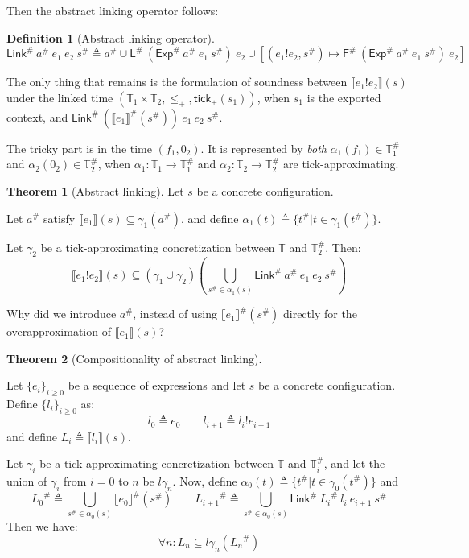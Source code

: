 \documentclass[acmsmall,review]{acmart}\settopmatter{printfolios=true,printccs=false,printacmref=false}
\theoremstyle{definition}
\newtheorem{definition}{Definition}[section]
\newtheorem{thm}{Theorem}[section]
\newcommand*{\A}[1]{{#1}^{\#}}
\newcommand*{\Time}{\mathbb{T}}
\newcommand*{\ATime}{\A{\Time}}
\newcommand*{\link}[2]{{#1}\mathtt{!}{#2}}
\newcommand*{\EE}{\mathsf{Exp}}
\newcommand*{\LL}{\mathsf{L}}
\newcommand*{\Link}{\mathsf{Link}}
\newcommand*{\sembracket}[1]{\lBrack{#1}\rBrack}
\newcommand*{\tick}{\mathsf{tick}}
\begin{document}
Then the abstract linking operator follows:
\begin{definition}[Abstract linking operator]
  \[
    \A\Link\:\A{a}\:e_1\:e_2\:\A{s}\triangleq\A{a}\cup\A\LL\:(\A\EE\:\A{a}\:e_1\:\A{s})\:e_2\cup[(\link{e_1}{e_2},\A{s})\mapsto\A{\mathsf{F}}\:(\A\EE\:\A{a}\:e_1\:\A{s})\:e_2]
  \]
\end{definition}

The only thing that remains is the formulation of soundness between $\sembracket{\link{e_1}{e_2}}(s)$ under the linked time $(\Time_1\times\Time_2,\le_+,\tick_{+}(s_1))$, when $s_1$ is the exported context,
and $\A\Link\:(\A{\sembracket{e_1}}(\A{s}))\:e_1\:e_2\:\A{s}$.

The tricky part is in the time $(f_1,0_2)$.
It is represented by \emph{both} $\alpha_1(f_1)\in\ATime_1$ and $\alpha_2(0_2)\in\ATime_2$, when $\alpha_1:\Time_1\rightarrow\ATime_1$ and $\alpha_2:\Time_2\rightarrow\ATime_2$ are tick-approximating.

\begin{thm}[Abstract linking]
  Let $s$ be a concrete configuration.

  Let $\A{a}$ satisfy $\sembracket{e_1}(s)\subseteq\gamma_1(\A{a})$, and define $\alpha_1(t)\triangleq\{\A{t}|t\in\gamma_1(\A{t})\}$.

  Let $\gamma_2$ be a tick-approximating concretization between $\Time$ and $\ATime_2$. Then:
  \[
    \sembracket{\link{e_1}{e_2}}(s)\subseteq(\gamma_1\cup\gamma_2)\left(\bigcup_{\A{s}\in\alpha_1(s)}{\A\Link\:\A{a}\:e_1\:e_2\:\A{s}}\right)
  \]
\end{thm}

Why did we introduce $\A{a}$, instead of using $\A{\sembracket{e_1}}(\A{s})$ directly for the overapproximation of $\sembracket{e_1}(s)$?

\begin{thm}[Compositionality of abstract linking]
  $\:$

  Let $\{e_i\}_{i\ge 0}$ be a sequence of expressions and let $s$ be a concrete configuration. Define $\{l_i\}_{i\ge 0}$ as:
  \[
    l_0\triangleq e_0\qquad l_{i+1}\triangleq\link{l_i}{e_{i+1}}
  \]
  and define $L_i\triangleq\sembracket{l_i}(s)$.

  Let $\gamma_i$ be a tick-approximating concretization between $\Time$ and $\ATime_i$, and let the union of $\gamma_i$ from $i=0$ to $n$ be $l\gamma_n$.
  Now, define $\alpha_0(t)\triangleq\{\A{t}|t\in\gamma_0(\A{t})\}$ and
  \[
    \A{L_0}\triangleq\bigcup_{\A{s}\in\alpha_0(s)}\A{\sembracket{e_0}}(\A{s})\qquad\A{L_{i+1}}\triangleq\bigcup_{\A{s}\in \alpha_0(s)}\A\Link\:\A{L_i}\:l_i\:e_{i+1}\:\A{s}
  \]
  Then we have:
  \[
    \forall n:L_n\subseteq l\gamma_n(\A{L_n})
  \]
\end{thm}


\end{document}
